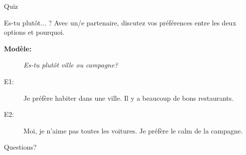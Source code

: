 \documentclass{beamer}
\begin{document}
  \begin{frame}{}
    \begin{center}
      \Large Quiz
    \end{center}
  \end{frame}

  \begin{frame}{Es-tu plutôt... ?}
    Avec un/e partenaire, discutez vos préférences entre les deux options et pourquoi.
    \begin{description}
      \item[\textbf{Modèle:}] \textit{Es-tu plutôt ville ou campagne?}
      \item[E1:] Je préfère habiter dans une ville. Il y a beaucoup de bons restaurants.
      \item[E2:] Moi, je n'aime pas toutes les voitures. Je préfère le calm de la campagne.
    \end{description}
  \end{frame}

  \begin{frame}{}
    \begin{center}
      \Large Questions?
    \end{center}
  \end{frame}
\end{document}
